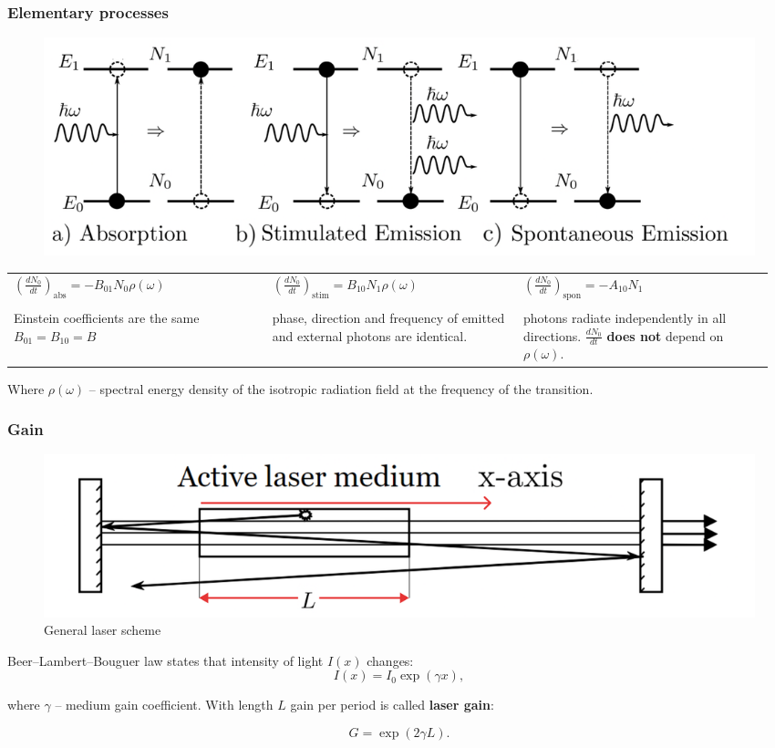 \documentclass{beamer}
\begin{document}
	\begin{frame}
		\frametitle{Elementary processes}
		\begin{figure}
			\centering
			\includegraphics[width=1\linewidth]{res/emission_types.pdf}
		\end{figure}
	
		\begin{table}
			\centering
			\footnotesize
			\begin{tabular}{p{0.33\linewidth}p{0.32\linewidth}p{0.32\linewidth}}

				$\left(\frac{dN_0}{dt}\right)_{\text{abs}} = - B_{01} N_0 \rho(\omega)$  &
				$\left(\frac{dN_0}{dt}\right)_{\text{stim}} = B_{10} N_1 \rho(\omega)$   &  
				$\left(\frac{dN_0}{dt}\right)_{\text{spon}} = - A_{10} N_1$ \\ & & \\
				 Einstein coefficients are the same $B_{01} = B_{10} = B$ & 
				 phase, direction and frequency of emitted and external photons are identical. &
				 photons radiate independently in all directions. $\frac{dN_0}{dt}$ \textbf{does not} depend on $\rho(\omega)$. \\
			\end{tabular}
		\end{table}
		
		\footnotesize
		Where $\rho(\omega)$ -- spectral energy density of the isotropic radiation field at the frequency of the transition.
	\end{frame}

	\begin{frame}
	\frametitle{Gain}
	
	\begin{figure}
		\centering
		\includegraphics[width=1\linewidth]{res/general_laser_scheme.pdf}
		\caption{General laser scheme}
		\label{fig:general_laser_scheme}
	\end{figure}
	Beer–Lambert–Bouguer law states that intensity of light $I(x)$ changes:
	$$I(x) = I_0 \exp({\gamma x}),$$
	
	where $\gamma$ -- medium gain coefficient. With length $L$ gain per period is called \textbf{laser gain}:
	
	$$G = \exp{(2\gamma L)}.$$
	\end{frame}
	
\end{document}
